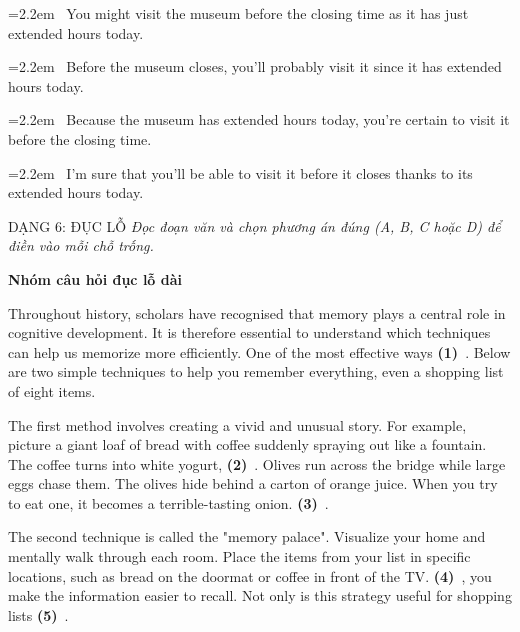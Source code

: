 \documentclass[12pt,a4paper,twoside]{article}
\newcounter{qcounter}
\newcommand{\choiceitem}[2]{%
    \tikz[baseline=-0.5ex]{%
        \node[draw=primaryBlue, circle, minimum size=1.5em, inner sep=0pt, thick] {\textbf{#1}};%
    }~#2%
}
\newenvironment{readingpassage}[1][]{%
    \begin{tcolorbox}[enhanced, colback=grayLight, colframe=secondaryBlue,
        coltitle=textDark, fonttitle=\bfseries, title={#1},
        rounded corners, arc=3mm, boxrule=1pt,
        left=15pt, right=15pt, top=10pt, bottom=10pt,
        breakable, before skip=10pt, after skip=10pt, drop fuzzy shadow]
    \setstretch{1.3}
}{\end{tcolorbox}}
\begin{document}
\par\vspace{4pt}
\noindent\hangindent=2.2em\choiceitem{A}{You might visit the museum before the closing time as it has just extended hours today.}\par\vspace{4pt}
\noindent\hangindent=2.2em\choiceitem{B}{Before the museum closes, you’ll probably visit it since it has extended hours today.}\par\vspace{4pt}
\noindent\hangindent=2.2em\choiceitem{C}{Because the museum has extended hours today, you’re certain to visit it before the closing time.}\par\vspace{4pt}
\noindent\hangindent=2.2em\choiceitem{D}{I’m sure that you’ll be able to visit it before it closes thanks to its extended hours today.}\par\vspace{4pt}


\newpage
{}
\begin{topicbox}{\large DẠNG 6: ĐỤC LỖ}
\textit{Đọc đoạn văn và chọn phương án đúng (A, B, C hoặc D) để điền vào mỗi chỗ trống.}
\end{topicbox}
\setcounter{qcounter}{0}
\begin{groupbox}\textbf{\large Nhóm câu hỏi đục lỗ dài}\end{groupbox}
\begin{readingpassage}[]
Throughout history, scholars have recognised that memory plays a central role in cognitive development. It is therefore essential to understand which techniques can help us memorize more efficiently. One of the most effective ways \textbf{(1)}~\underline{\hspace{1.3cm}}. Below are two simple techniques to help you remember everything, even a shopping list of eight items.

The first method involves creating a vivid and unusual story. For example, picture a giant loaf of bread with coffee suddenly spraying out like a fountain. The coffee turns into white yogurt, \textbf{(2)}~\underline{\hspace{1.3cm}}. Olives run across the bridge while large eggs chase them. The olives hide behind a carton of orange juice. When you try to eat one, it becomes a terrible-tasting onion. \textbf{(3)}~\underline{\hspace{1.3cm}}.

The second technique is called the "memory palace". Visualize your home and mentally walk through each room. Place the items from your list in specific locations, such as bread on the doormat or coffee in front of the TV. \textbf{(4)}~\underline{\hspace{1.3cm}}, you make the information easier to recall. Not only is this strategy useful for shopping lists \textbf{(5)}~\underline{\hspace{1.3cm}}.
\end{readingpassage}
\end{document}
